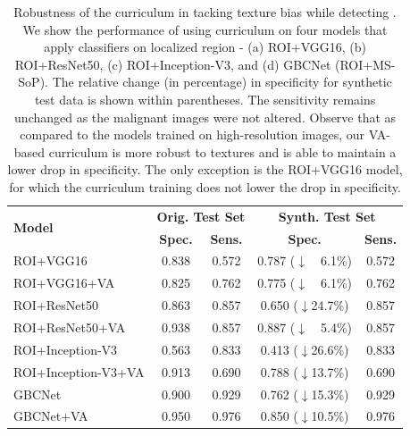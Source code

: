 \begin{table}[t]
	\centering
	\footnotesize
    \begin{tabular}{lcccc}
    \toprule[1pt]
    \multirow{2}{*}{\textbf{Model}} & \multicolumn{2}{c}{\textbf{Orig. Test Set}} & \multicolumn{2}{c}{\textbf{Synth. Test Set}} \\
    & \textbf{Spec.} & \textbf{Sens.} & \textbf{Spec.} & \textbf{Sens.}\\
    \midrule[0.5pt]
    ROI+VGG16 & 0.838 & 0.572 & 0.787 ($\downarrow$~~6.1\%) & 0.572 \\
    ROI+VGG16+VA & 0.825 & 0.762 & 0.775 ($\downarrow$~~6.1\%) & 0.762 \\
    \midrule
    ROI+ResNet50 & 0.863 & 0.857 & 0.650 ($\downarrow$24.7\%)& 0.857 \\
    ROI+ResNet50+VA & 0.938 & 0.857 & 0.887 ($\downarrow$~~5.4\%) & 0.857 \\
    \midrule
    ROI+Inception-V3 & 0.563 & 0.833 & 0.413 ($\downarrow$26.6\%) & 0.833 \\
    ROI+Inception-V3+VA & 0.913 & 0.690 & 0.788 ($\downarrow$13.7\%) & 0.690 \\
    \midrule
    GBCNet & 0.900 & 0.929 & 0.762 ($\downarrow$15.3\%) & 0.929 \\
    GBCNet+VA & 0.950 & 0.976 & 0.850 ($\downarrow$10.5\%) & 0.976 \\
    \bottomrule[1pt]
    \end{tabular}
    \caption[Robustness of the visual acuity curriculum in tacking texture bias]{Robustness of the curriculum in tacking texture bias while detecting \gbc. We show the performance of using curriculum on four models that apply classifiers on localized \gb region - (a) ROI+VGG16, (b) ROI+ResNet50, (c) ROI+Inception-V3, and (d) GBCNet (ROI+MS-SoP). The relative change (in percentage) in specificity for synthetic test data is shown within parentheses. The sensitivity remains unchanged as the malignant images were not altered. Observe that as compared to the models trained on high-resolution images, our VA-based curriculum is more robust to textures and is able to maintain a lower drop in specificity. The only exception is the ROI+VGG16 model, for which the curriculum training does not lower the drop in specificity. }
\label{tbl:curr_texture}
\end{table}


